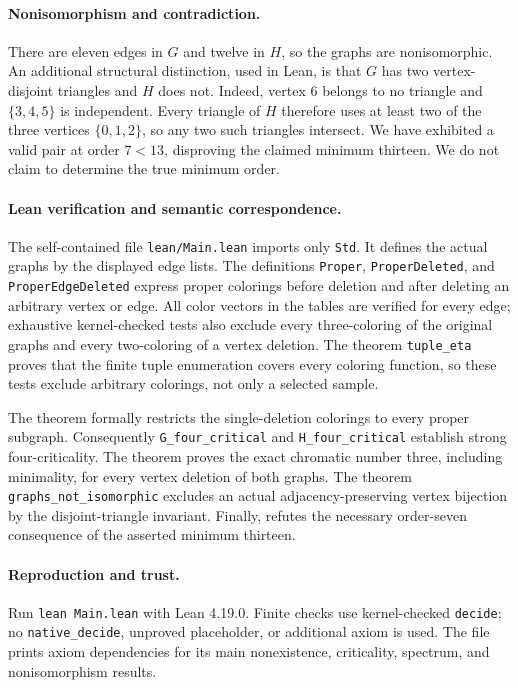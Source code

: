 \documentclass[10pt]{article}
\begin{document}
\paragraph{Nonisomorphism and contradiction.}
There are eleven edges in $G$ and twelve in $H$, so the graphs
are nonisomorphic. An additional structural distinction, used
in Lean, is that $G$ has two vertex-disjoint triangles and $H$
does not. Indeed, vertex $6$ belongs to no triangle and
$\{3,4,5\}$ is independent. Every triangle of $H$ therefore
uses at least two of the three vertices $\{0,1,2\}$, so any
two such triangles intersect.
We have exhibited a valid pair at order $7<13$, disproving
the claimed minimum thirteen. We do not claim to determine
the true minimum order.

\paragraph{Lean verification and semantic correspondence.}
The self-contained file \texttt{lean/Main.lean} imports only
\texttt{Std}. It defines the actual graphs by the displayed edge lists.
The definitions \texttt{Proper}, \texttt{ProperDeleted},
and \texttt{ProperEdgeDeleted} express proper colorings before
deletion and after deleting an arbitrary vertex or edge.
All color vectors in the tables are verified for every edge;
exhaustive kernel-checked tests also exclude every three-coloring
of the original graphs and every two-coloring of a vertex deletion.
The theorem \texttt{tuple\_eta} proves that the finite tuple
enumeration covers every coloring function, so these tests
exclude arbitrary colorings, not only a selected sample.

The theorem  formally restricts
the single-deletion colorings to every proper subgraph.
Consequently \texttt{G\_four\_critical} and
\texttt{H\_four\_critical} establish strong four-criticality.
The theorem  proves the exact
chromatic number three, including minimality, for every vertex
deletion of both graphs.
The theorem \texttt{graphs\_not\_isomorphic} excludes an actual
adjacency-preserving vertex bijection by the disjoint-triangle
invariant.
Finally,  refutes the
necessary order-seven consequence of the asserted minimum thirteen.

\paragraph{Reproduction and trust.}
Run \texttt{lean Main.lean} with Lean 4.19.0.
Finite checks use kernel-checked \texttt{decide}; no
\texttt{native\_decide}, unproved placeholder, or additional axiom
is used. The file prints axiom dependencies for its main
nonexistence, criticality, spectrum, and nonisomorphism results.
\end{document}
